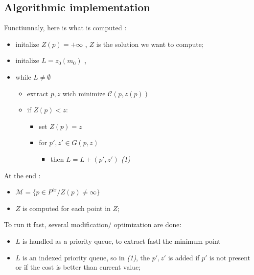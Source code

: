 

\subsection{Algorithmic implementation}

Functiunnaly, here is what is computed :

\begin{itemize}
     \item  initalize $Z(p) = + \infty $ , $Z$ is the solution we want to compute;
     \item  initalize $L = z_0(m_0)$ , 
     \item  while  $L \neq  \emptyset $
     
     \begin{itemize}
          \item   extract $p,z$ wich minimize $\mathcal{C}(p,z(p))$
          \item if $Z(p) < z $:
          \begin{itemize}
               \item set $Z(p) = z $
               \item for $p',z' \in G(p,z)$
               \begin{itemize}
                 \item then     $L = L + (p',z')$  \emph{(1)}
               \end{itemize}
          \end{itemize}
     \end{itemize}
\end{itemize}

At the end :

\begin{itemize}
     \item $ \mathcal{M} = \{p  \in P^{ix} / Z(p) \neq  \infty \} $
     \item $ Z $ is computed for each point in $Z$;
\end{itemize}

To run it fast, several modification/ optimization are done:

\begin{itemize}
   \item  $L$ is handled as a priority queue, to extract fastl the minimum point
   \item  $L$ is an indexed priority queue, so in   \emph{(1)}, the $p',z'$
          is added if $p'$ is not present or if the cost is better than current value;
\end{itemize}

